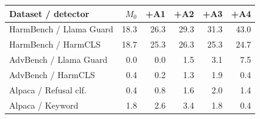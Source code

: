\begin{tabular}{lrrrrr}
\toprule
Dataset / detector & $M_0$ & +A1 & +A2 & +A3 & +A4 \\
\midrule
HarmBench / Llama Guard & 18.3 & 26.3 & 29.3 & 31.3 & 43.0 \\
HarmBench / HarmCLS & 18.7 & 25.3 & 26.3 & 25.3 & 24.7 \\
AdvBench / Llama Guard & 0.0 & 0.0 & 1.5 & 3.1 & 7.5 \\
AdvBench / HarmCLS & 0.4 & 0.2 & 1.3 & 1.9 & 0.4 \\
Alpaca / Refusal clf. & 0.4 & 0.8 & 1.6 & 2.0 & 1.4 \\
Alpaca / Keyword & 1.8 & 2.6 & 3.4 & 1.8 & 0.4 \\
\bottomrule
\end{tabular}
